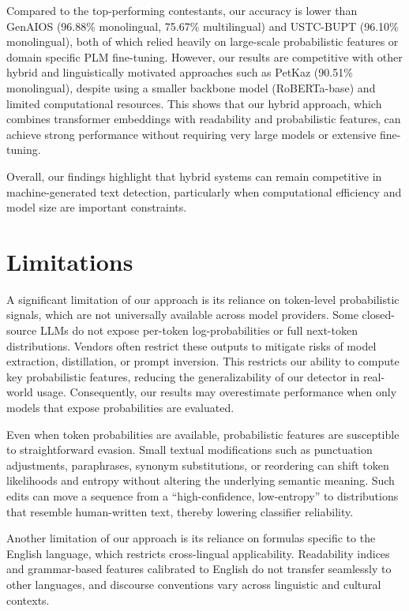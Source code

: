 \documentclass[11pt]{article}
\begin{document}
Compared to the top-performing contestants, our accuracy is lower than GenAIOS (96.88\% monolingual, 75.67\% multilingual) and USTC-BUPT (96.10\% monolingual), both of which relied heavily on large-scale probabilistic features or domain specific PLM fine-tuning. 
However, our results are competitive with other hybrid and linguistically motivated approaches such as PetKaz (90.51\% monolingual), despite using a smaller backbone model (RoBERTa-base) and limited computational resources. 
This shows that our hybrid approach, which combines transformer embeddings with readability and probabilistic features, can achieve strong performance without requiring very large models or extensive fine-tuning. 

Overall, our findings highlight that hybrid systems can remain competitive in machine-generated text detection, particularly when computational efficiency and model size are important constraints.

\section{Limitations}
A significant limitation of our approach is its reliance on token-level probabilistic signals, which are not universally available across model providers. Some closed-source LLMs do not expose per-token log-probabilities or full next-token distributions. Vendors often restrict these outputs to mitigate risks of model extraction, distillation, or prompt inversion. This restricts our ability to compute key probabilistic features, reducing the generalizability of our detector in real-world usage. Consequently, our results may overestimate performance when only models that expose probabilities are evaluated.

Even when token probabilities are available, probabilistic features are susceptible to straightforward evasion. Small textual modifications such as punctuation adjustments, paraphrases, synonym substitutions, or reordering can shift token likelihoods and entropy without altering the underlying semantic meaning. Such edits can move a sequence from a “high-confidence, low-entropy” to distributions that resemble human-written text, thereby lowering classifier reliability.

Another limitation of our approach is its reliance on formulas specific to the English language, which restricts cross-lingual applicability. Readability indices and grammar-based features calibrated to English do not transfer seamlessly to other languages, and discourse conventions vary across linguistic and cultural contexts.
\end{document}
